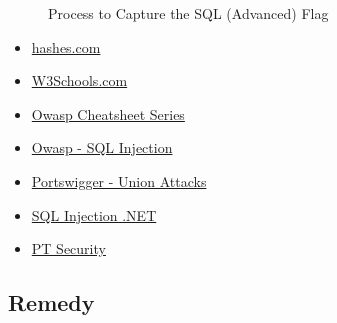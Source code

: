 \begin{figure}[!htb]
     \quad
    \caption[Flag 01 Method]{Process to Capture the SQL (Advanced) Flag} %
    \label{fig:flag01 method}
\end{figure}

\begin{itemize}
    \item \href{https://hashes.com/en}{hashes.com}
    \item \href{https://www.w3schools.com/sql/sql\_injection.asp}{W3Schools.com}
    \item \href{https://cheatsheetseries.owasp.org/cheatsheets/Injection\_Prevention\_Cheat\_Sheet.html}{Owasp Cheatsheet Series}
    \item \href{https://owasp.org/www-community/attacks/SQL\_Injection}{Owasp - SQL Injection}
    \item \href{https://portswigger.net/web-security/sql-injection/union-attacks}{Portswigger - Union Attacks}
    \item \href{https://www.sqlinjection.net/table-names/}{SQL Injection .NET}
    \item \href{https://www.ptsecurity.com/ww-en/analytics/knowledge-base/how-to-prevent-sql-injection-attacks/}{PT Security}
\end{itemize}

\subsection{Remedy}

